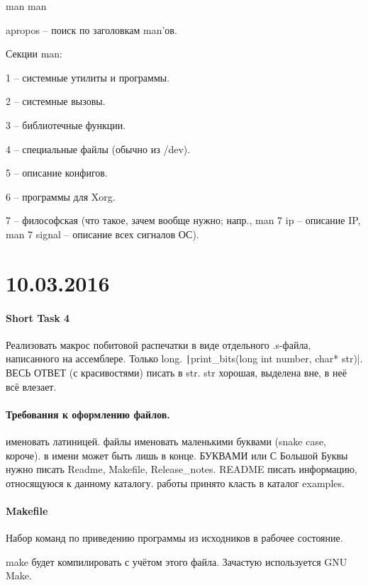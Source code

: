 \documentclass[a4paper,10pt]{article}
\newcommand{\ci}{\texttt}
\begin{document}
man man

apropos -- поиск по заголовкам man'ов.

Секции man:

1 -- системные утилиты и программы.

2 -- системные вызовы.

3 -- библиотечные функции.

4 -- специальные файлы (обычно из /dev).

5 -- описание конфигов.

6 -- программы для Xorg.

7 -- философская (что такое, зачем вообще нужно; напр., man 7 ip -- описание IP, man 7 signal -- описание всех сигналов ОС).

\section{10.03.2016}
\paragraph{Short Task 4}

Реализовать макрос побитовой распечатки в виде отдельного .s-файла, написанного на ассемблере.
Только long.
\ci|print_bits(long int number, char* str)|. ВЕСЬ ОТВЕТ (с красивостями) писать в str. str хорошая, выделена вне, в неё всё влезает.

\paragraph{Требования к оформлению файлов.}

\begin{enumerate}
 именовать латиницей.
 файлы именовать маленькими буквами (snake case, короче).
 в имени может быть лишь в конце.
 БУКВАМИ или С Большой Буквы нужно писать Readme, Makefile, Release\_notes.
 README писать информацию, относящуюся к данному каталогу.
 работы принято класть в каталог examples.
\end{enumerate}
\paragraph{Makefile}

Набор команд по приведению программы из исходников в рабочее состояние.

make будет компилировать с учётом этого файла. Зачастую используется GNU Make.
\end{document}
